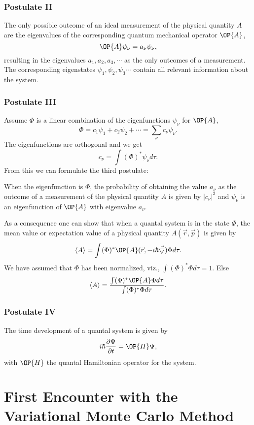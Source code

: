 \subsubsection{Postulate II}

The only possible outcome of  an ideal measurement of the physical
quantity $A$ are the eigenvalues of the corresponding quantum mechanical
operator $\OP{A}$,
%
\[
\OP{A} \psi_{\nu}
	 = a_{\nu} \psi_{\nu},
\]
%
resulting in the eigenvalues  $ a_1, a_2, a_3,\cdots$
as the only outcomes of a measurement. The corresponding
eigenstates
$ \psi_1, \psi_2, \psi_3 \cdots$
contain all relevant information about the system.

\subsubsection{Postulate III}
Assume $\Phi$ is
a linear combination of the eigenfunctions
$\psi_{\nu}$
for $\OP{A}$,
%
\[
\Phi = c_1 \psi_1 + c_2 \psi_2 + \cdots
  = \sum_{\nu} c_{\nu} \psi_{\nu}.
\]
%
The eigenfunctions are orthogonal 
and we get
%
\[
c_{\nu} = \int (\Phi)^{\ast} \psi_{\nu} d\tau.
\]
%
From this we can formulate the third postulate:\newline

When the eigenfunction is  $\Phi$, the probability of 
obtaining the value $a_{\nu}$ as the outcome of a measurement of the 
physical quantity
$A$ is given by $|c_{\nu}|^2$ and $\psi_{\nu}$ is an eigenfunction of
$\OP{A}$ with eigenvalue  $a_{\nu}$.

As a consequence one can show that
when a quantal system is in the state $\Phi$,
the mean value or expectation value of a physical quantity
$A(\vec{r}, \vec{p})$
is given by
%
\[
\langle A \rangle 
	= \int (\Phi)^{\ast} \OP{A}(\vec{r}, -i \hbar\vec{\bigtriangledown})
		 \Phi d\tau.
\]
We  have assumed that
$\Phi$ has been normalized, viz., $\int (\Phi)^{\ast} \Phi d\tau = 1$.
Else
%
\[
 \langle A \rangle = \frac{\int (\Phi)^{\ast} \OP{A} \Phi d\tau}
			  {\int (\Phi)^{\ast} \Phi d\tau}.
\]
\subsubsection{Postulate IV}
The time development of a quantal system is given by 
%
\[
i \hbar \frac{\partial \Psi}{\partial t} = \OP{H} \Psi,
\]
%
with $\OP{H}$ the quantal Hamiltonian operator for the system.


\section{First Encounter with the Variational Monte Carlo Method}

